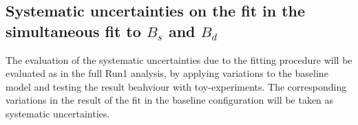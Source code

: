



\subsection{Systematic uncertainties on the fit in the simultaneous fit to $B_s$ and $B_d$}
\label{sub:sec:fit_syst}
The evaluation of the systematic uncertainties due to the fitting procedure 
will be evaluated as in the full Run1 analysis, by applying 
variations to the baseline model and testing the result beahviour 
with toy-experiments. The corresponding variations in the result of the fit in the baseline
configuration will be taken as systematic uncertainties.


\clearpage
